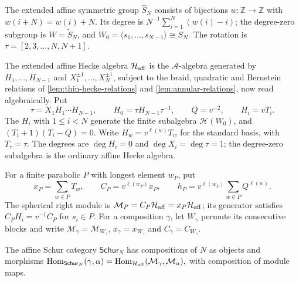 \documentclass[a4paper,11pt]{amsart}
\numberwithin{equation}{subsection}
\theoremstyle{plain}
\theoremstyle{definition}
\theoremstyle{remark}
\newcommand{\Hom}{\operatorname{Hom}}
\begin{document}
\begin{definition}\label{def:affine-hecke-conventions}
The extended affine symmetric group $\widehat S_N$ consists
of bijections $w:\mathbb Z\to\mathbb Z$ with
$w(i+N)=w(i)+N$. Its degree is
$N^{-1}\sum_{i=1}^N(w(i)-i)$; the degree-zero subgroup is
$W=\widetilde S_N$, and
$W_0=\langle s_1,\ldots,s_{N-1}\rangle\cong S_N$.
The rotation is $\tau=[2,3,\ldots,N,N+1]$.

The extended affine Hecke algebra $\mathcal H_{\rm aff}$ is
the $\mathcal A$-algebra generated by $H_1,\ldots,H_{N-1}$
and $X_1^{\pm1},\ldots,X_N^{\pm1}$, subject to the braid,
quadratic and Bernstein relations of
\autoref{lem:thin-hecke-relations} and
\autoref{lem:annular-relations}, now read algebraically. Put
\[
\tau=X_1H_1\cdots H_{N-1},\qquad
H_0=\tau H_{N-1}\tau^{-1},\qquad
Q=v^{-2},\qquad H_i=vT_i.
\]
The $H_i$ with $1\le i<N$ generate the finite subalgebra
$\mathcal H(W_0)$, and $(T_i+1)(T_i-Q)=0$.
Write $H_w=v^{\ell(w)}T_w$ for the standard basis, with
$T_\tau=\tau$. The degrees are $\deg H_i=0$ and
$\deg X_i=\deg\tau=1$; the degree-zero subalgebra is
the ordinary affine Hecke algebra.
\end{definition}

\begin{definition}\label{def:spherical-modules}
For a finite parabolic $P$ with longest element $w_P$, put
\[
x_P=\sum_{w\in P}T_w,\qquad
C_P=v^{\ell(w_P)}x_P,\qquad
h_P=v^{\ell(w_P)}\sum_{w\in P}Q^{\ell(w)}.
\]
The spherical right module is
$\mathcal M_P=C_P\mathcal H_{\rm aff}=x_P\mathcal H_{\rm aff}$;
its generator satisfies $C_PH_i=v^{-1}C_P$ for $s_i\in P$.
For a composition $\gamma$, let $W_\gamma$ permute its
consecutive blocks and write $\mathcal M_\gamma=\mathcal M_{W_\gamma}$,
$x_\gamma=x_{W_\gamma}$ and $C_\gamma=C_{W_\gamma}$.
\end{definition}

\begin{definition}\label{def:affine-schur-maps}
The affine Schur category $\mathsf{Schur}_N$ has compositions
of $N$ as objects and morphisms
$\Hom_{\mathsf{Schur}_N}(\gamma,\alpha) =\Hom_{\mathcal H_{\rm aff}}(\mathcal M_\gamma,\mathcal M_\alpha),$
with composition of module maps.
\end{definition}
\end{document}
